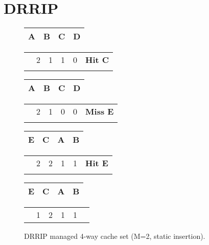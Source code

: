 \section{DRRIP}
\label{sec:algorithms:drrip}

\begin{figure}[ht]
    \centering
    \begin{tabular}{|p{2cm}|p{2cm}|p{2cm}|p{2cm}|}
        \hline
        A & B & C & D \\
        \hline
    \end{tabular}
    \begin{tabular}{p{2cm}p{2cm}p{2cm}p{2cm}p{2cm}p{2cm}}
        & 2 & 1 & 1 & 0 & \bf{Hit C} \\
        &   &   &   &   &
    \end{tabular}    

    \begin{tabular}{|p{2cm}|p{2cm}|p{2cm}|p{2cm}|}
        \hline
        A & B & C & D \\
        \hline
    \end{tabular}
    \begin{tabular}{p{2cm}p{2cm}p{2cm}p{2cm}p{2cm}p{2cm}}
        & 2 & 1 & 0 & 0 & \bf{Miss E} \\
        &   &   &   &   &
    \end{tabular}     

    \begin{tabular}{|p{2cm}|p{2cm}|p{2cm}|p{2cm}|}
        \hline
        E & C & A & B \\
        \hline
    \end{tabular}
    \begin{tabular}{p{2cm}p{2cm}p{2cm}p{2cm}p{2cm}p{2cm}}
        & 2 & 2 & 1 & 1 & \bf{Hit E} \\
        &   &   &   &   &
    \end{tabular}    

    \begin{tabular}{|p{2cm}|p{2cm}|p{2cm}|p{2cm}|}
        \hline
        E & C & A & B \\
        \hline
    \end{tabular}
    \begin{tabular}{p{2cm}p{2cm}p{2cm}p{2cm}p{2cm}p{2cm}}
        & 1 & 2 & 1 & 1 & 
    \end{tabular} 

    \caption{DRRIP managed 4-way cache set (M=2, static insertion).}
    \label{fig:algorithms:drrip_example}
\end{figure}

